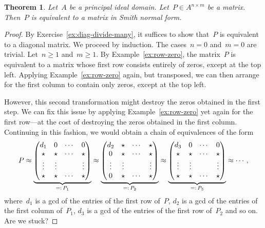 \documentclass[12pt]{scrartcl}
\theoremstyle{definition}
\theoremstyle{plain}
\newtheorem{theorem}[definition]{Theorem}
\theoremstyle{remark}
\begin{document}
\begin{theorem}\label{thm:smith}Let~$A$ be a principal ideal domain. Let~$P \in A^{n \times m}$ be a matrix. Then~$P$ is equivalent to a matrix in Smith normal form.\end{theorem}

\begin{proof}By Exercise~\ref{ex:diag-divide-many}, it suffices to show that~$P$ is equivalent to a diagonal matrix. We proceed by induction. The cases~$n = 0$ and~$m = 0$ are trivial. Let~$n \geq 1$ and~$m \geq 1$. By Example~\ref{ex:row-zero}, the matrix~$P$ is equivalent to a matrix whose first row consists entirely of zeros, except at the top left. Applying Example~\ref{ex:row-zero} again, but transposed, we can then arrange for the first column to contain only zeros, except at the top left.

However, this second transformation might destroy the zeros obtained in the first step. We can fix this issue by applying Example~\ref{ex:row-zero} yet again for the first row---at the cost of destroying the zeros obtained in the first column. Continuing in this fashion, we would obtain a chain of equivalences of the form
\[ P \approx
\underbrace{\begin{pmatrix}d_1&0&\cdots&0\\\star&\star&\cdots&\star\\\vdots&\vdots&&\vdots\\\star&\star&\cdots&\star\end{pmatrix}}_{=\vcentcolon\, P_1} \approx
\underbrace{\begin{pmatrix}d_2&\star&\cdots&\star\\0&\star&\cdots&\star\\\vdots&\vdots&&\vdots\\0&\star&\cdots&\star\end{pmatrix}}_{=\vcentcolon\, P_2} \approx
\underbrace{\begin{pmatrix}d_3&0&\cdots&0\\\star&\star&\cdots&\star\\\vdots&\vdots&&\vdots\\\star&\star&\cdots&\star\end{pmatrix}}_{=\vcentcolon\, P_3} \approx \cdots, \]
where~$d_1$ is a gcd of the entries of the first row of~$P$, $d_2$ is a gcd of the entries of the first column of~$P_1$, $d_3$ is a gcd of the entries of the first row of~$P_2$ and so on. Are we stuck?


\end{proof}
\end{document}
